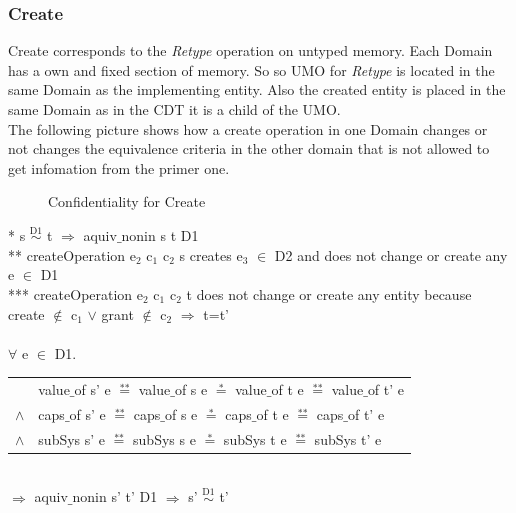 \documentclass[pdftex,11pt,a4paper]{article}
\begin{document}
\subsubsection{Create}\label{sec:Create}
Create corresponds to the \textit{Retype} operation on untyped memory. Each Domain has a own and fixed section of memory. So so UMO for \textit{Retype} is located in the same Domain as the implementing entity. Also the created entity is placed in the same Domain as in the CDT it is a child of the UMO.  \\
The following picture shows how a create operation in one Domain changes or not changes the equivalence criteria in the other domain that is not allowed to get infomation from the primer one. 
\begin{flushleft}
\begin{figure}[H]
\caption{Confidentiality for Create}
\end{figure}
\end{flushleft}
* s $\overset{\text{D1}}{\sim}$ t $\Rightarrow$ aquiv$\_$nonin s t D1	\\ 
** createOperation e$_2$ c$_1$ c$_2$ s creates e$_3$ $\in$ D2 and does not change or create any e $\in$ D1 \\
*** createOperation e$_2$ c$_1$ c$_2$ t does not change or create any entity because create $\notin$ c$_1$ $\vee$ grant $\notin$ c$_2$    $\Rightarrow$    t=t' \\ \\
$\forall$ e $\in$ D1. \\ 
\begin{tabular}{ll}
& value$\_$of s' e $\overset{\text{**}}{=}$ value$\_$of s e $\overset{\text{*}}{=}$ value$\_$of t e $\overset{\text{**}}{=}$ value$\_$of t' e \\
$\wedge$ & caps$\_$of s' e $\overset{\text{**}}{=}$ caps$\_$of s e $\overset{\text{*}}{=}$ caps$\_$of t e $\overset{\text{**}}{=}$ caps$\_$of t' e \\
$\wedge$ & subSys s' e $\overset{\text{**}}{=}$ subSys s e $\overset{\text{*}}{=}$ subSys t e $\overset{\text{**}}{=}$ subSys t' e
\end{tabular} \\
$\Rightarrow$ aquiv$\_$nonin s' t' D1 $\Rightarrow$ s' $\overset{\text{D1}}{\sim}$ t' 
\end{document}
